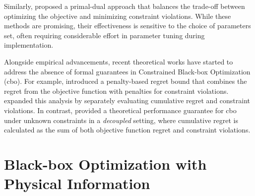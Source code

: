 Similarly, \citet{zhou2022kernelized} proposed a primal-dual approach that balances the trade-off between optimizing the objective and minimizing constraint violations. While these methods are promising, their effectiveness is sensitive to the choice of parameters set, often requiring considerable effort in parameter tuning during implementation.

Alongside empirical advancements, recent theoretical works have started to address the absence of formal guarantees in Constrained Black-box Optimization (\ac{cbo}). For example, \citet{lu2022no} introduced a penalty-based regret bound that combines the regret from the objective function with penalties for constraint violations. \citet{xu2023constrained} expanded this analysis by separately evaluating cumulative regret and constraint violations. In contrast, \citet{nguyen2023optimistic} provided a theoretical performance guarantee for \ac{cbo} under unknown constraints in a \textit{decoupled} setting, where cumulative regret is calculated as the sum of both objective function regret and constraint violations.
\section{Black-box Optimization with Physical Information}
\label{section:bo_physics}

